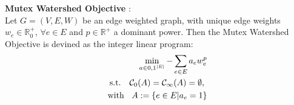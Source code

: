  \begin{defn}
 	\textbf{Mutex Watershed Objective} \cite{wolf2019mutex}: \\
 	Let $G = (V, E, W)$ be an edge weighted graph, with unique edge weights $w_e \in \mathbb{R}_0^+$, $\forall e \in E$ and $p \in \mathbb{R}^+$ a dominant power. Then the Mutex Watershed Objective is devined as the integer linear program:\\
 	\begin{align}
 		\min_{a\in {0,1}^{|E|}} - \sum_{e \in E} a_e w_e^p \\
		\text{s.t. \hspace{2mm}} \mathcal{C}_0(A) = \mathcal{C_1}(A) = \emptyset \text{, }\\
		\text{with \hspace{2mm}} A := \{ e \in E|a_e = 1 \}
 	\end{align}
 \end{defn}
